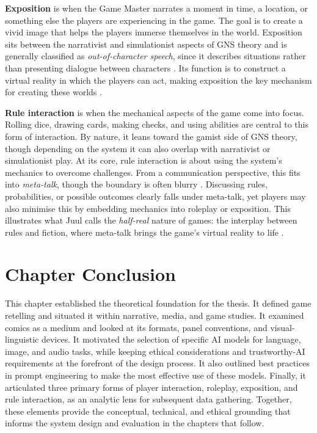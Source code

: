 \textbf{Exposition} is when the Game Master narrates a moment in time, a location, or something else the players are experiencing in the game. The goal is to create a vivid image that helps the players immerse themselves in the world. Exposition sits between the narrativist and simulationist aspects of GNS theory and is generally classified as \textit{out-of-character speech}, since it describes situations rather than presenting dialogue between characters \cite{bowman2010social}. Its function is to construct a virtual reality in which the players can act, making exposition the key mechanism for creating these worlds \cite{ryan2001narrative}.

\textbf{Rule interaction} is when the mechanical aspects of the game come into focus. Rolling dice, drawing cards, making checks, and using abilities are central to this form of interaction. By nature, it leans toward the gamist side of GNS theory, though depending on the system it can also overlap with narrativist or simulationist play. At its core, rule interaction is about using the system’s mechanics to overcome challenges. From a communication perspective, this fits into \textit{meta-talk}, though the boundary is often blurry \cite{bowman2010social}. Discussing rules, probabilities, or possible outcomes clearly falls under meta-talk, yet players may also minimise this by embedding mechanics into roleplay or exposition. This illustrates what Juul calls the \textit{half-real} nature of games: the interplay between rules and fiction, where meta-talk brings the game’s virtual reality to life \cite{juul2011half}.

\section{Chapter Conclusion}
This chapter established the theoretical foundation for the thesis. It defined game retelling and situated it within narrative, media, and game studies. It examined comics as a medium and looked at its formats, panel conventions, and visual-linguistic devices. It motivated the selection of specific AI models for language, image, and audio tasks, while keeping ethical considerations and trustworthy-AI requirements at the forefront of the design process. It also outlined best practices in prompt engineering to make the most effective use of these models. Finally, it articulated three primary forms of player interaction, roleplay, exposition, and rule interaction, as an analytic lens for subsequent data gathering. Together, these elements provide the conceptual, technical, and ethical grounding that informs the system design and evaluation in the chapters that follow.